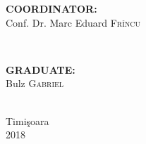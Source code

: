 \documentclass[12pt, a4paper]{report}
\begin{document}
\begin{titlepage}

\begin{minipage}{0.4\textwidth}
\begin{flushleft} \large
\textbf{COORDINATOR:}\\
Conf. Dr. Marc Eduard \textsc{Fr\^incu} %
\end{flushleft}
\end{minipage}
~
\begin{minipage}{0.4\textwidth}
\begin{flushright} \large
\textbf{GRADUATE:} \\
Bulz \textsc{Gabriel} %
\end{flushright}
\end{minipage}\\[1cm]


\vfill
{\large Timi\c{s}oara \\2018}\\ %

 


\end{titlepage}


\end{document}
